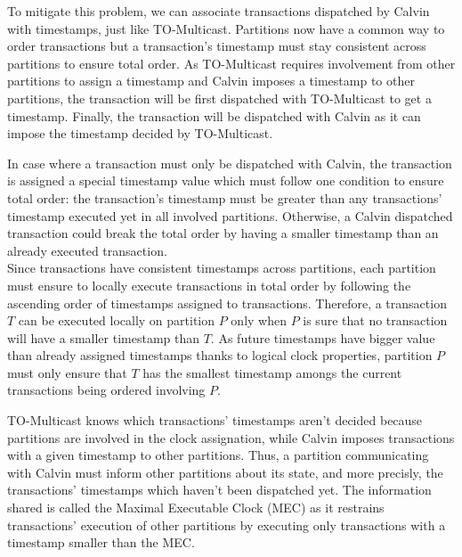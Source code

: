 \documentclass[a4paper, 10pt]{article}
\newcommand{\GE}{TO-Multicast}
\newcommand{\PE}{Calvin}
\begin{document}
   To mitigate this problem, we can associate transactions dispatched by \PE{} with
   timestamps, just like \GE{}. Partitions now have a common way to order transactions but
   a transaction's timestamp must stay consistent across partitions to ensure total order.
   As \GE{} requires involvement from other partitions to assign a timestamp and \PE{}
   imposes a timestamp to other partitions, the transaction will be first dispatched
   with \GE{} to get a timestamp. Finally, the transaction will be dispatched with \PE{}
   as it can impose the timestamp decided by \GE{}.

   In case where a transaction must only be dispatched with \PE{}, the transaction is
   assigned a special timestamp value which must follow one condition to ensure
   total order: the transaction's timestamp must be greater than any transactions' timestamp executed yet
   in all involved partitions.
   Otherwise, a \PE{} dispatched transaction could
   break the total order by having a smaller timestamp than an already executed
   transaction. \\

   Since transactions have consistent timestamps across partitions, each partition
   must ensure to locally execute transactions in total order by following the ascending order
   of timestamps assigned to transactions.
   Therefore, a transaction $T$ can be executed locally on partition $P$ only when $P$ is sure that no
   transaction will have a smaller timestamp than $T$. As future timestamps have
   bigger value than already assigned timestamps thanks to logical clock properties,
   partition $P$ must only ensure that $T$ has the smallest timestamp amongs
   the current transactions being ordered involving $P$.

   \GE{} knows which transactions' timestamps aren't decided because partitions are involved in
   the clock assignation, while \PE{} imposes transactions with a given timestamp
   to other partitions. Thus, a partition communicating with \PE{} must inform
   other partitions about its state, and more precisly, the transactions' timestamps which haven't
   been dispatched yet.
   The information shared is called the Maximal Executable Clock (MEC) as
   it restrains transactions' execution of other partitions by executing only transactions with a timestamp
   smaller than the MEC.
\end{document}
